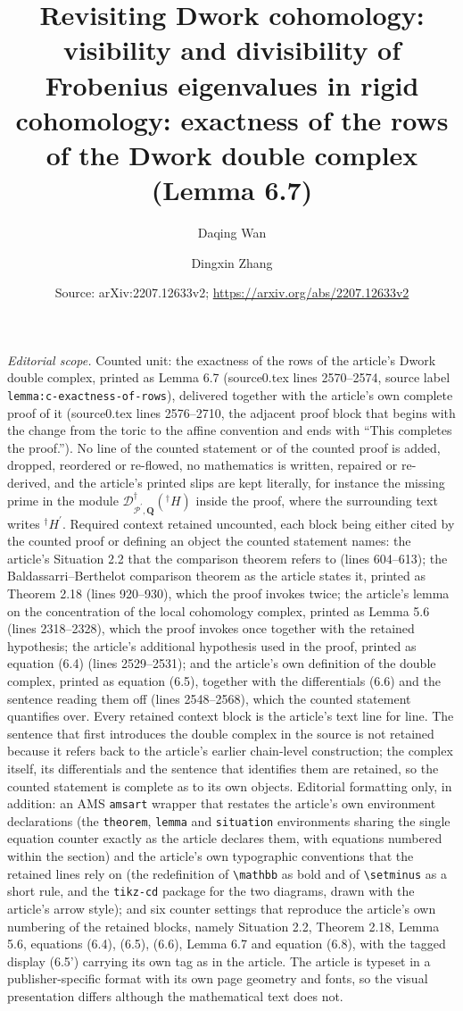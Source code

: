 \documentclass[10pt,a4paper]{amsart}
\title{Revisiting Dwork cohomology: visibility and divisibility of Frobenius eigenvalues in rigid cohomology: exactness of the rows of the Dwork double complex (Lemma 6.7)}
\author{Daqing Wan}
\author{Dingxin Zhang}
\date{Source: arXiv:2207.12633v2; \url{https://arxiv.org/abs/2207.12633v2}}
\numberwithin{equation}{section}
\renewcommand{\mathbb}{\mathbf}
\theoremstyle{plain}
\theoremstyle{definition}
\theoremstyle{plain}
\begin{document}
\maketitle
\noindent\textit{Editorial scope.} Counted unit: the exactness of the rows of the article's Dwork double complex, printed as Lemma 6.7 (source0.tex lines 2570--2574, source label \texttt{lemma:c-exactness-of-rows}), delivered together with the article's own complete proof of it (source0.tex lines 2576--2710, the adjacent proof block that begins with the change from the toric to the affine convention and ends with ``This completes the proof.''). No line of the counted statement or of the counted proof is added, dropped, reordered or re-flowed, no mathematics is written, repaired or re-derived, and the article's printed slips are kept literally, for instance the missing prime in the module $\mathscr{D}^{\dagger}_{\mathcal{P}^{\prime},\mathbb{Q}}({}^{\dagger}H)$ inside the proof, where the surrounding text writes ${}^{\dagger}H^{\prime}$.
Required context retained uncounted, each block being either cited by the counted proof or defining an object the counted statement names: the article's Situation 2.2 that the comparison theorem refers to (lines 604--613); the Baldassarri--Berthelot comparison theorem as the article states it, printed as Theorem 2.18 (lines 920--930), which the proof invokes twice; the article's lemma on the concentration of the local cohomology complex, printed as Lemma 5.6 (lines 2318--2328), which the proof invokes once together with the retained hypothesis; the article's additional hypothesis used in the proof, printed as equation (6.4) (lines 2529--2531); and the article's own definition of the double complex, printed as equation (6.5), together with the differentials (6.6) and the sentence reading them off (lines 2548--2568), which the counted statement quantifies over. Every retained context block is the article's text line for line. The sentence that first introduces the double complex in the source is not retained because it refers back to the article's earlier chain-level construction; the complex itself, its differentials and the sentence that identifies them are retained, so the counted statement is complete as to its own objects.
Editorial formatting only, in addition: an AMS \texttt{amsart} wrapper that restates the article's own environment declarations (the \texttt{theorem}, \texttt{lemma} and \texttt{situation} environments sharing the single equation counter exactly as the article declares them, with equations numbered within the section) and the article's own typographic conventions that the retained lines rely on (the redefinition of \texttt{\textbackslash mathbb} as bold and of \texttt{\textbackslash setminus} as a short rule, and the \texttt{tikz-cd} package for the two diagrams, drawn with the article's arrow style); and six counter settings that reproduce the article's own numbering of the retained blocks, namely Situation 2.2, Theorem 2.18, Lemma 5.6, equations (6.4), (6.5), (6.6), Lemma 6.7 and equation (6.8), with the tagged display (6.5') carrying its own tag as in the article. The article is typeset in a publisher-specific format with its own page geometry and fonts, so the visual presentation differs although the mathematical text does not.
\end{document}
